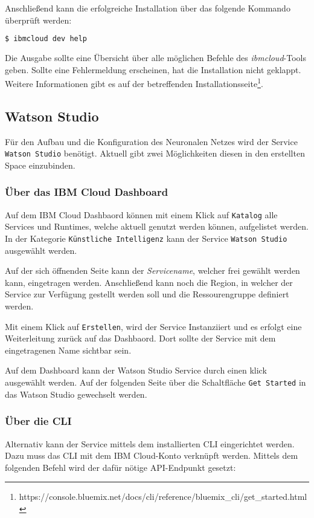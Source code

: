 Anschließend kann die erfolgreiche Installation über das folgende Kommando überprüft werden:

\begin{lstlisting}[language=bash, caption=Installation des CLI überprüfen, label=Installation des CLI überprüfen]
    $ ibmcloud dev help
\end{lstlisting}

Die Ausgabe sollte eine Übersicht über alle möglichen Befehle des \textit{ibmcloud}-Tools geben. Sollte eine Fehlermeldung
erscheinen, hat die Installation nicht geklappt. Weitere Informationen gibt es auf der betreffenden
Installationsseite\footnote{https://console.bluemix.net/docs/cli/reference/bluemix\_cli/get\_started.html}.

\subsection{Watson Studio}
Für den Aufbau und die Konfiguration des Neuronalen Netzes wird der Service \texttt{Watson Studio} benötigt. Aktuell gibt
zwei Möglichkeiten diesen in den erstellten Space einzubinden.

\subsubsection*{Über das IBM Cloud Dashboard}
Auf dem IBM Cloud Dashbaord können mit einem Klick auf \texttt{Katalog} alle Services und Runtimes, welche aktuell genutzt
werden können, aufgelistet werden. In der Kategorie \texttt{Künstliche Intelligenz} kann der Service \texttt{Watson Studio}
ausgewählt werden.

Auf der sich öffnenden Seite kann der \textit{Servicename}, welcher frei gewählt werden kann, eingetragen werden. Anschließend
kann noch die Region, in welcher der Service zur Verfügung gestellt werden soll und die Ressourengruppe definiert werden.

Mit einem Klick auf \texttt{Erstellen}, wird der Service Instanziiert und es erfolgt eine Weiterleitung zurück auf das
Dashbaord. Dort sollte der Service mit dem eingetragenen Name sichtbar sein.

Auf dem Dashboard kann der Watson Studio Service durch einen klick ausgewählt werden. Auf der folgenden Seite über die
Schaltfläche \texttt{Get Started} in das Watson Studio gewechselt werden.

\subsubsection*{Über die CLI}
Alternativ kann der Service mittels dem installierten CLI eingerichtet werden. Dazu muss das CLI mit dem IBM
Cloud-Konto verknüpft werden. Mittels dem folgenden Befehl wird der dafür nötige API-Endpunkt gesetzt:

